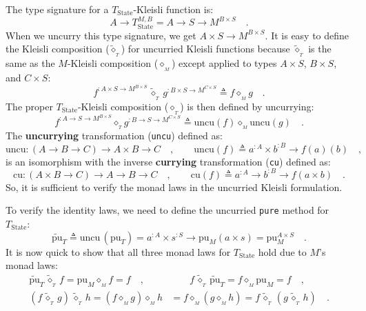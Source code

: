 The type signature for a $T_{\text{State}}$-Kleisli function is:
\[
A\rightarrow T_{\text{State}}^{M,B}=A\rightarrow S\rightarrow M^{B\times S}\quad.
\]
When we uncurry this type signature, we get $A\times S\rightarrow M^{B\times S}$.
It is easy to define the Kleisli composition ($\tilde{\diamond}_{_{T}}$)
for uncurried Kleisli functions because $\tilde{\diamond}_{_{T}}$
is the same as the $M$-Kleisli composition ($\diamond_{_{M}}$) except
applied to types $A\times S$, $B\times S$, and $C\times S$:
\[
f^{:A\times S\rightarrow M^{B\times S}}\,\tilde{\diamond}_{_{T}}\,g^{:B\times S\rightarrow M^{C\times S}}\triangleq f\diamond_{_{M}}g\quad.
\]
The proper $T_{\text{State}}$-Kleisli composition ($\diamond_{_{T}}$)
is then defined by uncurrying:
\[
f^{:A\rightarrow S\rightarrow M^{B\times S}}\diamond_{_{T}}g^{:B\rightarrow S\rightarrow M^{C\times S}}\triangleq\text{uncu}\left(f\right)\diamond_{_{M}}\text{uncu}\left(g\right)\quad.
\]
The \textbf{uncurrying} transformation (\lstinline!uncu!)
defined as:
\[
\text{uncu}:\left(A\rightarrow B\rightarrow C\right)\rightarrow A\times B\rightarrow C\quad,\quad\quad\text{uncu}\left(f\right)\triangleq a^{:A}\times b^{:B}\rightarrow f(a)(b)\quad,
\]
is an isomorphism with the inverse \textbf{currying}
transformation (\lstinline!cu!) defined as:
\[
\text{cu}:\left(A\times B\rightarrow C\right)\rightarrow A\rightarrow B\rightarrow C\quad,\quad\quad\text{cu}\left(f\right)\triangleq a^{:A}\rightarrow b^{:B}\rightarrow f(a\times b)\quad.
\]
So, it is sufficient to verify the monad laws in the uncurried Kleisli
formulation. 

To verify the identity laws, we need to define the uncurried \lstinline!pure!
method for $T_{\text{State}}$:
\[
\tilde{\text{pu}}_{T}\triangleq\text{uncu}\,(\text{pu}_{T})=a^{:A}\times s^{:S}\rightarrow\text{pu}_{M}(a\times s)=\text{pu}_{M}^{A\times S}\quad.
\]
It is now quick to show that all three monad laws for $T_{\text{State}}$
hold due to $M$\textsf{'}s monad laws:
\begin{align*}
\tilde{\text{pu}}_{T}\,\tilde{\diamond}_{_{T}}\,f=\text{pu}_{M}\diamond_{_{M}}f=f\quad, & \quad\quad f\,\tilde{\diamond}_{_{T}}\,\tilde{\text{pu}}_{T}=f\diamond_{_{M}}\text{pu}_{M}=f\quad,\\
(f\,\tilde{\diamond}_{_{T}}\,g)\,\tilde{\diamond}_{_{T}}\,h=(f\diamond_{_{M}}g)\diamond_{_{M}}h & =f\diamond_{_{M}}(g\diamond_{_{M}}h)=f\,\tilde{\diamond}_{_{T}}\,(g\,\tilde{\diamond}_{_{T}}\,h)\quad.
\end{align*}


